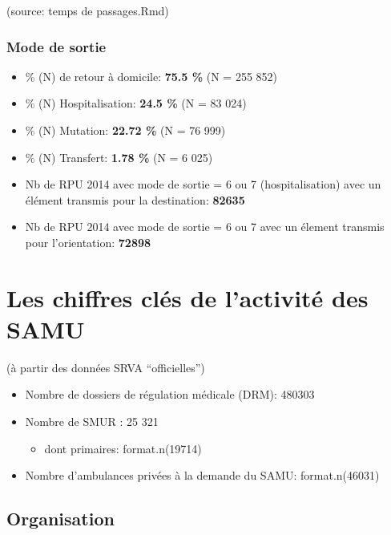 \documentclass[]{article}
\begin{document}
(source: temps de passages.Rmd)

\subsubsection{Mode de sortie}\label{mode-de-sortie}

\begin{itemize}
\itemsep1pt\parskip0pt
\item
  \% (N) de retour à domicile: \textbf{75.5 \%} (N = 255 852)
\item
  \% (N) Hospitalisation: \textbf{24.5 \%} (N = 83 024)
\item
  \% (N) Mutation: \textbf{22.72 \%} (N = 76 999)
\item
  \% (N) Transfert: \textbf{1.78 \%} (N = 6 025)
\item
  Nb de RPU 2014 avec mode de sortie = 6 ou 7 (hospitalisation) avec un
  élément transmis pour la destination: \textbf{82635}
\item
  Nb de RPU 2014 avec mode de sortie = 6 ou 7 avec un élement transmis
  pour l'orientation: \textbf{72898}
\end{itemize}

\section{Les chiffres clés de l'activité des
SAMU}\label{les-chiffres-cles-de-lactivite-des-samu}

(à partir des données SRVA ``officielles'')

\begin{itemize}
\itemsep1pt\parskip0pt
\item
  Nombre de dossiers de régulation médicale (DRM): 480303
\item
  Nombre de SMUR : 25 321

  \begin{itemize}
  \itemsep1pt\parskip0pt
  \item
    dont primaires: format.n(19714)
  \end{itemize}
\item
  Nombre d'ambulances privées à la demande du SAMU: format.n(46031)
\end{itemize}

\subsection{Organisation}\label{organisation}
\end{document}
